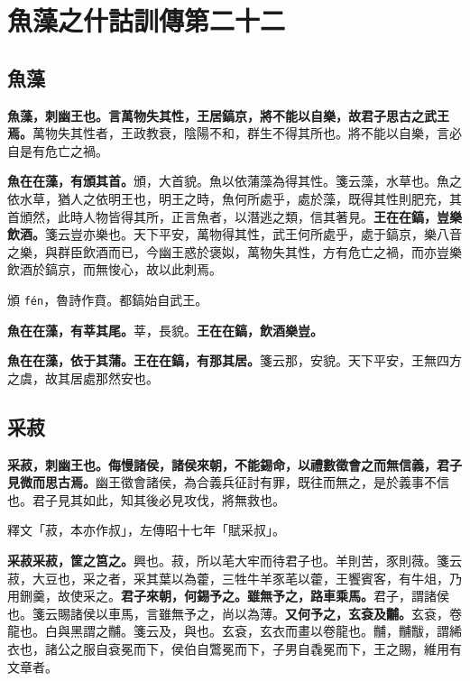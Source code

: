 \chapter{魚藻之什詁訓傳第二十二}

\section{魚藻}


\textbf{魚藻，刺幽王也。言萬物失其性，王居鎬京，將不能以自樂，故君子思古之武王焉。}{\footnotesize 萬物失其性者，王政教衰，陰陽不和，群生不得其所也。將不能以自樂，言必自是有危亡之禍。}

\textbf{魚在在藻，有頒其首。}{\footnotesize 頒，大首貌。魚以依蒲藻為得其性。箋云藻，水草也。魚之依水草，猶人之依明王也，明王之時，魚何所處乎，處於藻，既得其性則肥充，其首頒然，此時人物皆得其所，正言魚者，以潛逃之類，信其著見。}\textbf{王在在鎬，豈樂飲酒。}{\footnotesize 箋云豈亦樂也。天下平安，萬物得其性，武王何所處乎，處于鎬京，樂八音之樂，與群臣飲酒而已，今幽王惑於褒姒，萬物失其性，方有危亡之禍，而亦豈樂飲酒於鎬京，而無悛心，故以此刺焉。}

\begin{quoting}頒 \texttt{fén}，魯詩作賁。都鎬始自武王。\end{quoting}

\textbf{魚在在藻，有莘其尾。}{\footnotesize 莘，長貌。}\textbf{王在在鎬，飲酒樂豈。}

\textbf{魚在在藻，依于其蒲。王在在鎬，有那其居。}{\footnotesize 箋云那，安貌。天下平安，王無四方之虞，故其居處那然安也。}

\section{采菽}


\textbf{采菽，刺幽王也。侮慢諸侯，諸侯來朝，不能錫命，以禮數徵會之而無信義，君子見微而思古焉。}{\footnotesize 幽王徵會諸侯，為合義兵征討有罪，既往而無之，是於義事不信也。君子見其如此，知其後必見攻伐，將無救也。}

\begin{quoting}釋文「菽，本亦作叔」，左傳昭十七年「賦采叔」。\end{quoting}

\textbf{采菽采菽，筐之筥之。}{\footnotesize 興也。菽，所以芼大牢而待君子也。羊則苦，豕則薇。箋云菽，大豆也，采之者，采其葉以為藿，三牲牛羊豕芼以藿，王饗賓客，有牛俎，乃用鉶羹，故使采之。}\textbf{君子來朝，何錫予之。雖無予之，路車乘馬。}{\footnotesize 君子，謂諸侯也。箋云賜諸侯以車馬，言雖無予之，尚以為薄。}\textbf{又何予之，玄袞及黼。}{\footnotesize 玄袞，卷龍也。白與黑謂之黼。箋云及，與也。玄袞，玄衣而畫以卷龍也。黼，黼黻，謂絺衣也，諸公之服自袞冕而下，侯伯自鷩冕而下，子男自毳冕而下，王之賜，維用有文章者。}

